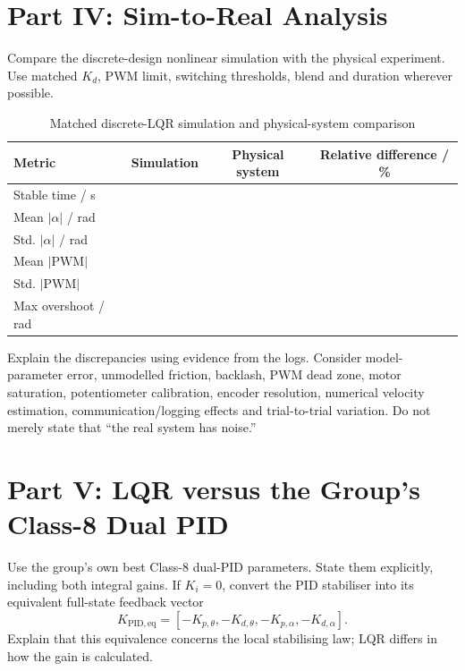 \documentclass[11pt,a4paper]{article}
\newcommand{\studenttext}[1]{\begin{studentbox}\vspace{#1}\end{studentbox}}
\begin{document}
\studenttext{40mm}


\section{Part IV: Sim-to-Real Analysis}
\label{sec:sim2real}

Compare the discrete-design nonlinear simulation with the physical experiment.
Use matched $K_d$, PWM limit, switching thresholds, blend and duration wherever
possible.

\begin{table}[H]
\centering
\caption{Matched discrete-LQR simulation and physical-system comparison}
\label{tab:sim2real}
\begin{tabular}{lccc}
\toprule
Metric & Simulation & Physical system & Relative difference / \%\\
\midrule
Stable time / s & & & \\
Mean $|\alpha|$ / rad & & & \\
Std. $|\alpha|$ / rad & & & \\
Mean $|\mathrm{PWM}|$ & & & \\
Std. $|\mathrm{PWM}|$ & & & \\
Max overshoot / rad & & & \\
\bottomrule
\end{tabular}
\end{table}

Explain the discrepancies using evidence from the logs. Consider model-parameter
error, unmodelled friction, backlash, PWM dead zone, motor saturation,
potentiometer calibration, encoder resolution, numerical velocity estimation,
communication/logging effects and trial-to-trial variation. Do not merely state
that ``the real system has noise.''

\studenttext{55mm}

\section{Part V: LQR versus the Group's Class-8 Dual PID}
\label{sec:pidcompare}

Use the group's own best Class-8 dual-PID parameters. State them explicitly,
including both integral gains. If $K_i=0$, convert the PID stabiliser into its
equivalent full-state feedback vector
\[
K_{\mathrm{PID,eq}}=
[-K_{p,\theta},-K_{d,\theta},-K_{p,\alpha},-K_{d,\alpha}].
\]
Explain that this equivalence concerns the local stabilising law; LQR differs in
how the gain is calculated.
\end{document}
